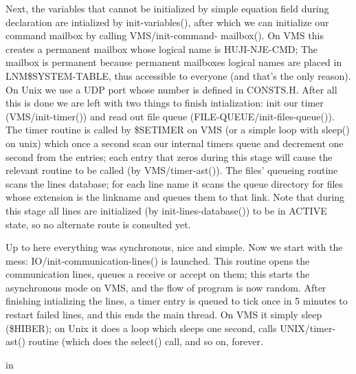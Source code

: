 Next,  the variables that cannot be initialized by simple equation field
during declaration are intialized by init-variables(),  after  which  we
can   initialize   our  command  mailbox  by  calling  VMS/init-command-
mailbox(). On VMS this creates a permanent mailbox whose logical name is
HUJI-NJE-CMD;  The  mailbox  is  permanent  because  permanent mailboxes
logical  names  are  placed  in  LNM\$SYSTEM-TABLE,  thus  accessible  to
everyone  (and  that's the only reason). On Unix we use a UDP port whose
number is defined in CONSTS.H. After all this is done we are  left  with
two  things  to  finish intialization: init our timer (VMS/init-timer())
and read  out  file  queue  (FILE-QUEUE/init-files-queue()).  The  timer
routine  is  called by \$SETIMER on VMS (or a simple loop with sleep() on
unix) which once a second scan our internal timers queue  and  decrement
one  second  from  the  entries; each entry that zeros during this stage
will cause the relevant routine to be called (by VMS/timer-ast()).
The files' queueing routine scans the lines database; for each line name
it  scans  the queue directory for files whose extension is the linkname
and queues them to that link. Note that during this stage all lines  are
initialized  (by  init-lines-database())  to  be  in ACTIVE state, so no
alternate route is consulted yet.

Up to here everything was synchronous, nice and simple. Now we  start
with  the  mess: IO/init-communication-lines() is launched. This routine
opens the communication lines, queues a receive or accept on them;  this
starts  the  asynchronous  mode  on  VMS, and the flow of program is now
random. After finishing intializing the lines, a timer entry  is  queued
to  tick  once  in  5 minutes to restart failed lines, and this ends the
main thread. On VMS it simply sleep (\$HIBER); on Unix  it  does  a  loop
which  sleeps one second, calls UNIX/timer-ast() routine (which does the
select() call, and so on, forever.

 in

